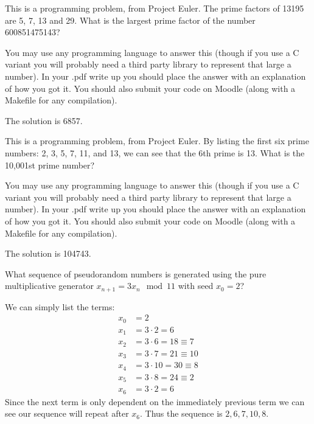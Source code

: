 \documentclass[addpoints]{exam}
\begin{document}
\begin{questions}
  \question[10] This is a programming problem, from Project Euler. The prime
  factors of 13195 are 5, 7, 13 and 29. What is the largest prime factor of the
  number 600851475143? 

  You may use any programming language to answer this  (though if you use a C
  variant you will probably need a third party library to represent that large a
  number). In your .pdf write up you should place the answer with an explanation
  of how you got it. You should also submit your code on Moodle (along with a
  Makefile for any compilation).
  \begin{solution}
    The solution is 6857.
  \end{solution}

  \question[10] This is a programming problem, from Project Euler. By listing
  the first six prime numbers: 2, 3, 5, 7, 11, and 13, we can see that the 6th
  prime is 13. What is the 10,001st prime number?

  You may use any programming language to answer this  (though if you use a C
  variant you will probably need a third party library to represent that large a
  number). In your .pdf write up you should place the answer with an explanation
  of how you got it. You should also submit your code on Moodle (along with a
  Makefile for any compilation).
  \begin{solution}
    The solution is 104743.
  \end{solution}

  \question[5] What sequence of pseudorandom numbers is generated using the pure
  multiplicative generator $x_{n+1} =3x_n \mod 11$ with seed $x_0 = 2$?
  \begin{solution}
    We can simply list the terms:
    \begin{align*}
        x_0 &= 2\\
        x_1 &= 3\cdot 2 = 6\\
        x_2 &= 3\cdot 6 = 18 \equiv 7\\
        x_3 &= 3\cdot 7 = 21 \equiv 10\\
        x_4 &= 3\cdot 10 = 30 \equiv 8\\
        x_5 &= 3\cdot 8 = 24 \equiv 2\\
        x_6 &= 3\cdot 2 = 6
    \end{align*}
    Since the next term is only dependent on the immediately previous term we
    can see our sequence will repeat after $x_6$. Thus the sequence is $2, 6,
    7, 10, 8$.
  \end{solution}


\end{questions}
\end{document}
